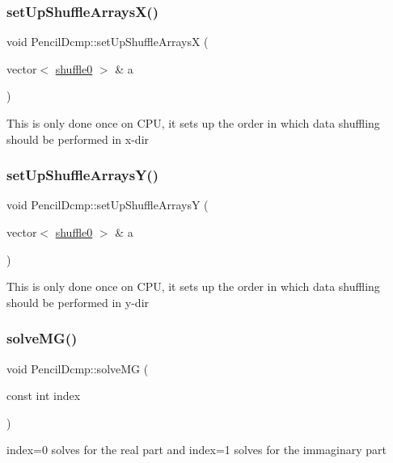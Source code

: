 \subsubsection{\texorpdfstring{set\+Up\+Shuffle\+Arrays\+X()}{setUpShuffleArraysX()}}
{\footnotesize\ttfamily void Pencil\+Dcmp\+::set\+Up\+Shuffle\+ArraysX (\begin{DoxyParamCaption}\item[{vector$<$ \mbox{\hyperlink{structshuffle}{shuffle0}} $>$ \&}]{a }\end{DoxyParamCaption})}

This is only done once on C\+PU, it sets up the order in which data shuffling should be performed in x-\/dir \mbox{\label{classPencilDcmp_a30bae43ce292f1ddb54e16c3b0f6bbfd}} 
\subsubsection{\texorpdfstring{set\+Up\+Shuffle\+Arrays\+Y()}{setUpShuffleArraysY()}}
{\footnotesize\ttfamily void Pencil\+Dcmp\+::set\+Up\+Shuffle\+ArraysY (\begin{DoxyParamCaption}\item[{vector$<$ \mbox{\hyperlink{structshuffle}{shuffle0}} $>$ \&}]{a }\end{DoxyParamCaption})}

This is only done once on C\+PU, it sets up the order in which data shuffling should be performed in y-\/dir \mbox{\label{classPencilDcmp_a9a27e4f6c9f2b567009759c0c03506c1}} 
\subsubsection{\texorpdfstring{solve\+M\+G()}{solveMG()}}
{\footnotesize\ttfamily void Pencil\+Dcmp\+::solve\+MG (\begin{DoxyParamCaption}\item[{const int}]{index }\end{DoxyParamCaption})}

index=0 solves for the real part and index=1 solves for the immaginary part \mbox{\label{classPencilDcmp_a5eaf7b3581e2cbe3ee3595cd44154a73}} 
